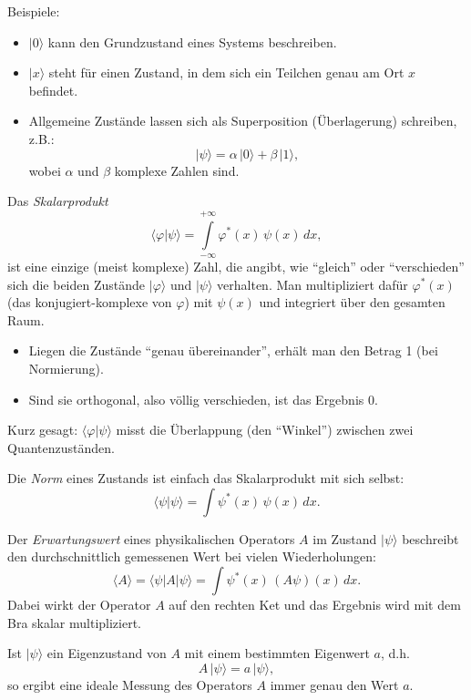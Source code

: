 		Beispiele:
		\begin{itemize}
		\item $|0\rangle$ kann den Grundzustand eines Systems beschreiben.
		\item $|x\rangle$ steht für einen Zustand, in dem sich ein Teilchen genau am Ort $x$ befindet.
		\item Allgemeine Zustände lassen sich als Superposition (Überlagerung) schreiben, z.B.:
		\[
			|\psi\rangle = \alpha\,|0\rangle + \beta\,|1\rangle,
		\]
		wobei $\alpha$ und $\beta$ komplexe Zahlen sind.
		\end{itemize}

		Das \emph{Skalarprodukt}
		\begin{equation}
		\langle \varphi | \psi \rangle = \int\limits_{-\infty}^{+\infty} \varphi^*(x)\,\psi(x)\,dx,
		\end{equation}
		ist eine einzige (meist komplexe) Zahl, die angibt, wie ``gleich'' oder ``verschieden'' sich die beiden Zustände $|\varphi\rangle$ und $|\psi\rangle$ verhalten.
		Man multipliziert dafür $\varphi^*(x)$ (das konjugiert-komplexe von $\varphi$) mit $\psi(x)$ und integriert über den gesamten Raum.
		\begin{itemize}
			\item Liegen die Zustände ``genau übereinander'', erhält man den Betrag 1 (bei Normierung).
			\item Sind sie orthogonal, also völlig verschieden, ist das Ergebnis 0.
		\end{itemize}
		Kurz gesagt:
		$\langle \varphi | \psi \rangle$ misst die Überlappung (den ``Winkel'') zwischen zwei Quantenzuständen.

		Die \emph{Norm} eines Zustands ist einfach das Skalarprodukt mit sich selbst:
		\begin{equation}
		\langle \psi | \psi \rangle = \int \psi^*(x)\,\psi(x)\,dx.
		\end{equation}

		Der \emph{Erwartungswert} eines physikalischen Operators $A$ im Zustand $|\psi\rangle$ beschreibt den durchschnittlich gemessenen Wert bei vielen Wiederholungen:
		\begin{equation}
		\langle A \rangle = \langle \psi | A | \psi \rangle = \int \psi^*(x)\,(A\psi)(x)\,dx.
		\end{equation}
		Dabei wirkt der Operator $A$ auf den rechten Ket und das Ergebnis wird mit dem Bra skalar multipliziert.
		
		Ist $|\psi\rangle$ ein Eigenzustand von $A$ mit einem bestimmten Eigenwert $a$, d.h.
		\begin{equation}
		A\,|\psi\rangle = a\,|\psi\rangle,
		\end{equation}
		so ergibt eine ideale Messung des Operators $A$ immer genau den Wert $a$.

